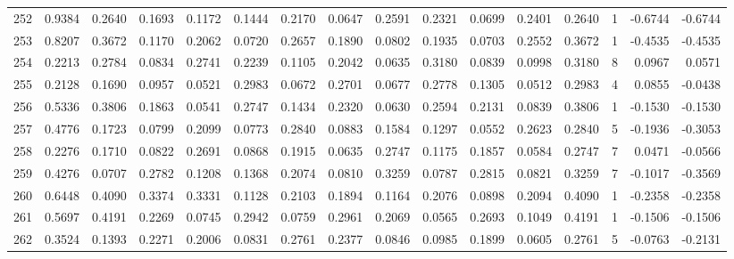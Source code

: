 \begin{tabular}{lrrrrrrrrrrrrrrr}
252 &      0.9384 &  0.2640 &  0.1693 &  0.1172 &  0.1444 &  0.2170 &  0.0647 &  0.2591 &  0.2321 &  0.0699 &   0.2401 &     0.2640 &      1 &                   -0.6744 &                    -0.6744 \\
253 &      0.8207 &  0.3672 &  0.1170 &  0.2062 &  0.0720 &  0.2657 &  0.1890 &  0.0802 &  0.1935 &  0.0703 &   0.2552 &     0.3672 &      1 &                   -0.4535 &                    -0.4535 \\
254 &      0.2213 &  0.2784 &  0.0834 &  0.2741 &  0.2239 &  0.1105 &  0.2042 &  0.0635 &  0.3180 &  0.0839 &   0.0998 &     0.3180 &      8 &                    0.0967 &                     0.0571 \\
255 &      0.2128 &  0.1690 &  0.0957 &  0.0521 &  0.2983 &  0.0672 &  0.2701 &  0.0677 &  0.2778 &  0.1305 &   0.0512 &     0.2983 &      4 &                    0.0855 &                    -0.0438 \\
256 &      0.5336 &  0.3806 &  0.1863 &  0.0541 &  0.2747 &  0.1434 &  0.2320 &  0.0630 &  0.2594 &  0.2131 &   0.0839 &     0.3806 &      1 &                   -0.1530 &                    -0.1530 \\
257 &      0.4776 &  0.1723 &  0.0799 &  0.2099 &  0.0773 &  0.2840 &  0.0883 &  0.1584 &  0.1297 &  0.0552 &   0.2623 &     0.2840 &      5 &                   -0.1936 &                    -0.3053 \\
258 &      0.2276 &  0.1710 &  0.0822 &  0.2691 &  0.0868 &  0.1915 &  0.0635 &  0.2747 &  0.1175 &  0.1857 &   0.0584 &     0.2747 &      7 &                    0.0471 &                    -0.0566 \\
259 &      0.4276 &  0.0707 &  0.2782 &  0.1208 &  0.1368 &  0.2074 &  0.0810 &  0.3259 &  0.0787 &  0.2815 &   0.0821 &     0.3259 &      7 &                   -0.1017 &                    -0.3569 \\
260 &      0.6448 &  0.4090 &  0.3374 &  0.3331 &  0.1128 &  0.2103 &  0.1894 &  0.1164 &  0.2076 &  0.0898 &   0.2094 &     0.4090 &      1 &                   -0.2358 &                    -0.2358 \\
261 &      0.5697 &  0.4191 &  0.2269 &  0.0745 &  0.2942 &  0.0759 &  0.2961 &  0.2069 &  0.0565 &  0.2693 &   0.1049 &     0.4191 &      1 &                   -0.1506 &                    -0.1506 \\
262 &      0.3524 &  0.1393 &  0.2271 &  0.2006 &  0.0831 &  0.2761 &  0.2377 &  0.0846 &  0.0985 &  0.1899 &   0.0605 &     0.2761 &      5 &                   -0.0763 &                    -0.2131 \\

\end{tabular}
